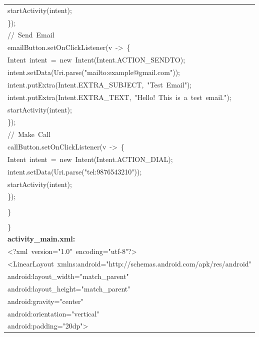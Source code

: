 \documentclass[a4paper,12pt]{article}
\begin{document}
\begin{longtable}{|p{}|}
{\ttfamily\small startActivity(intent);} \\
{\ttfamily\small \});} \\
{\ttfamily\small //\ Send\ Email} \\
{\ttfamily\small emailButton.setOnClickListener(v\ -\textgreater{}\ \{} \\
{\ttfamily\small Intent\ intent\ =\ new\ Intent(Intent.ACTION\_SENDTO);} \\
{\ttfamily\small intent.setData(Uri.parse("mailto:example@gmail.com"));} \\
{\ttfamily\small intent.putExtra(Intent.EXTRA\_SUBJECT,\ "Test\ Email");} \\
{\ttfamily\small intent.putExtra(Intent.EXTRA\_TEXT,\ "Hello!\ This\ is\ a\ test\ email.");} \\
{\ttfamily\small startActivity(intent);} \\
{\ttfamily\small \});} \\
{\ttfamily\small //\ Make\ Call} \\
{\ttfamily\small callButton.setOnClickListener(v\ -\textgreater{}\ \{} \\
{\ttfamily\small Intent\ intent\ =\ new\ Intent(Intent.ACTION\_DIAL);} \\
{\ttfamily\small intent.setData(Uri.parse("tel:9876543210"));} \\
{\ttfamily\small startActivity(intent);} \\
{\ttfamily\small \});} \\
\strut \\
{\ttfamily\small \}} \\
\strut \\
{\ttfamily\small \}} \\
\hline
\rule{0pt}{13pt}\textbf{activity\_main.xml:} \\
\hline
{\ttfamily\small \textless{}?xml\ version="1.0"\ encoding="utf-8"?\textgreater{}} \\
{\ttfamily\small \textless{}LinearLayout\ xmlns:android="http://schemas.android.com/apk/res/android"} \\
{\ttfamily\small android:layout\_width="match\_parent"} \\
{\ttfamily\small android:layout\_height="match\_parent"} \\
{\ttfamily\small android:gravity="center"} \\
{\ttfamily\small android:orientation="vertical"} \\
{\ttfamily\small android:padding="20dp"\textgreater{}} \\

\end{longtable}
\end{document}
